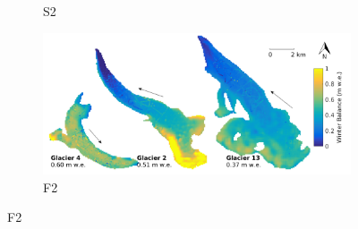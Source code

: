 \documentclass{sfuthesis}
\begin{document}
\begin{figure}
\begin{subfigure}[b]{0.475\textwidth}
            \caption[]%
            {{\small S2}}    
        \end{subfigure}
        \quad
        \begin{subfigure}[b]{0.475\textwidth}   
            \centering 
            \includegraphics[width=\textwidth]{MLRmap_Modelled_Observed4.png}
            \caption[]%
            {{\small F2}}    
        \end{subfigure}
        

\end{figure}
\end{document}
